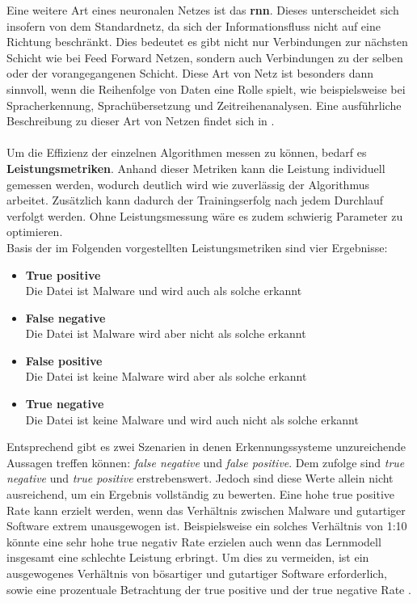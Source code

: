 \documentclass[
    12pt, %
    DIV10,
    ngerman, %
    a4paper, %
    oneside, %
    titlepage, %
    parskip=half, %
    headings=normal, %
    listof=totoc, %
    bibliography=totoc, %
    index=totoc, %
    captions=tableheading, %
    final %
]{scrreprt}
\begin{document}
Eine weitere Art eines neuronalen Netzes ist das \textbf{\ac{rnn}}. Dieses unterscheidet sich insofern von dem Standardnetz, da sich der Informationsfluss nicht auf eine Richtung beschränkt. Dies bedeutet es gibt nicht nur Verbindungen zur nächsten Schicht wie bei Feed Forward Netzen, sondern auch Verbindungen zu der selben oder der vorangegangenen Schicht. Diese Art von Netz ist besonders dann sinnvoll, wenn die Reihenfolge von Daten eine Rolle spielt, wie beispielsweise bei Spracherkennung, Sprachübersetzung und Zeitreihenanalysen. Eine ausführliche Beschreibung zu dieser Art von Netzen findet sich in \textcite{ravichandiran2018hands}.
\\\\
Um die Effizienz der einzelnen Algorithmen messen zu können, bedarf es \textbf{Leistungsmetriken}. Anhand dieser Metriken kann die Leistung individuell gemessen werden, wodurch deutlich wird wie zuverlässig der Algorithmus arbeitet. Zusätzlich kann dadurch der Trainingserfolg nach jedem Durchlauf verfolgt werden. Ohne Leistungsmessung wäre es zudem schwierig Parameter zu optimieren.\\
Basis der im Folgenden vorgestellten Leistungsmetriken sind vier Ergebnisse:
\begin{itemize}
\item \textbf{True positive}\\ Die Datei ist Malware und wird auch als solche erkannt
\item \textbf{False negative}\\ Die Datei ist Malware wird aber nicht als solche erkannt
\item \textbf{False positive}\\ Die Datei ist keine Malware wird aber als solche erkannt
\item \textbf{True negative}\\ Die Datei ist keine Malware und wird auch nicht als solche erkannt
\end{itemize}
Entsprechend gibt es zwei Szenarien in denen Erkennungssysteme unzureichende Aussagen treffen können: \emph{false negative} und \emph{false positive}. Dem zufolge sind \emph{true negative} und \emph{true positive} erstrebenswert. Jedoch sind diese Werte allein nicht ausreichend, um ein Ergebnis vollständig zu bewerten. Eine hohe true positive Rate kann erzielt werden, wenn das Verhältnis zwischen Malware und gutartiger Software extrem unausgewogen ist. Beispielsweise ein solches Verhältnis von 1:10 könnte eine sehr hohe true negativ Rate erzielen auch wenn das Lernmodell insgesamt eine schlechte Leistung erbringt. Um dies zu vermeiden, ist ein ausgewogenes Verhältnis von bösartiger und gutartiger Software erforderlich, sowie eine prozentuale Betrachtung der true positive und der true negative Rate \parencite{Aldwairi2018}.\\\\
\end{document}
